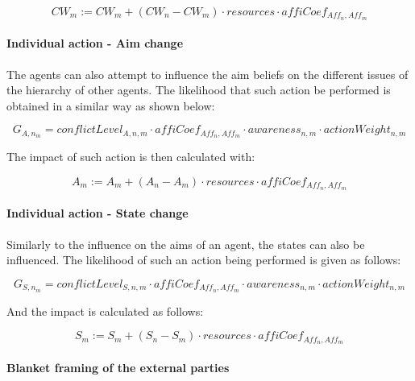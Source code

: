 \begin{equation}\label{eq:impactFraming2}
CW_{m} := CW_{m} + \left(CW_{n} - CW_{m} \right) \cdot resources \cdot affiCoef_{Aff_n,Aff_m}
\end{equation}

\paragraph{Individual action - Aim change}

The agents can also attempt to influence the aim beliefs on the different issues of the hierarchy of other agents. The likelihood that such action be performed is obtained in a similar way as shown below:

\begin{equation}\label{eq:likelihoodAimChange2}
G_{A, n_m} = conflictLevel_{A, n, m} \cdot affiCoef_{Aff_n,Aff_m} \cdot awareness_{n,m} \cdot actionWeight_{n,m}
\end{equation}

The impact of such action is then calculated with:

\begin{equation}\label{eq:impactAimChange2}
A_{m} := A_{m} + \left(A_{n} - A_{m} \right) \cdot resources \cdot affiCoef_{Aff_n,Aff_m}
\end{equation}

\paragraph{Individual action - State change}

Similarly to the influence on the aims of an agent, the states can also be influenced. The likelihood of such an action being performed is given as follows:

\begin{equation}\label{eq:likelihoodStateChange2}
G_{S, n_m} = conflictLevel_{S, n,m} \cdot affiCoef_{Aff_n,Aff_m} \cdot awareness_{n,m} \cdot actionWeight_{n,m}
\end{equation}

And the impact is calculated as follows:

\begin{equation}\label{eq:impactStateChange2}
S_{m} := S_{m} + \left(S_{n} - S_{m} \right) \cdot resources \cdot affiCoef_{Aff_n,Aff_m}
\end{equation}

\paragraph{Blanket framing of the external parties}

